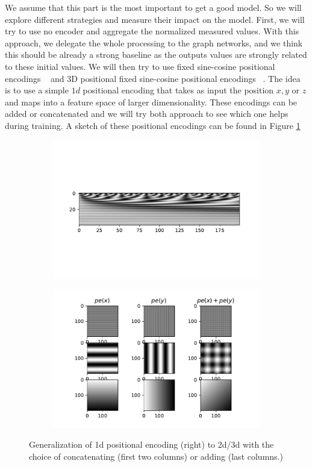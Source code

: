\documentclass[a4paper,10pt]{article}
\begin{document}
We assume that this part is the most important to get a good model. So we will explore different strategies and measure their impact on the model. First, we will try to use no encoder and aggregate the normalized measured values. With this approach, we delegate the whole processing to the graph networks, and we think this should be already a strong baseline as the outputs values are strongly related to these initial values. We will then try to use fixed sine-cosine positional encodings ~\cite{vaswani2017attention} and 3D positional fixed sine-cosine positional encodings ~\cite{chu2021conditional}. The idea is to use a simple $1d$ positional encoding that takes as input the position $x,y$ or $z$ and maps into a feature space of larger dimensionality. These encodings can be added or concatenated and we will try both approach to see which one helps during training. A sketch of these positional encodings can be found in Figure \ref{fig:posenc}

\begin{figure}
  \begin{subfigure}{0.4\textwidth}
    \includegraphics[width=\textwidth]{../windgraph/1dposenc}
  \end{subfigure}
  \begin{subfigure}{0.5\textwidth}
    \includegraphics[width=\textwidth]{../windgraph/posenc}
  \end{subfigure}
  \caption{Generalization of 1d positional encoding (right) to 2d/3d with the choice of concatenating (first two columns) or adding (last columns.)}
  \label{fig:posenc}
\end{figure}
\end{document}
